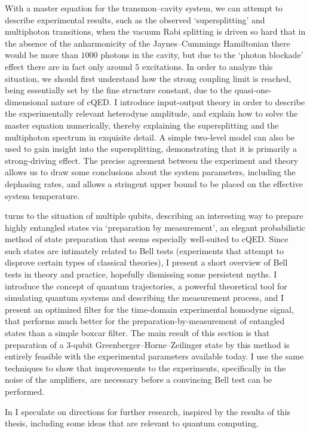 With a master equation for the transmon--cavity system, we can attempt to describe experimental results, such as the observed `supersplitting' and multiphoton transitions, when the vacuum Rabi splitting is driven so hard that in the absence of the anharmonicity of the Jaynes--Cummings Hamiltonian there would be more than $1000$ photons in the cavity, but due to the `photon blockade' effect there are in fact only around $5$ excitations. In order to analyze this situation, we should first understand how the strong coupling limit is reached, being essentially set by the fine structure constant, due to the quasi-one-dimensional nature of cQED\@. I introduce input-output theory in order to describe the experimentally relevant heterodyne amplitude, and explain how to solve the master equation numerically, thereby explaining the supersplitting and the multiphoton spectrum in exquisite detail. A simple two-level model can also be used to gain insight into the supersplitting, demonstrating that it is primarily a strong-driving effect. The precise agreement between the experiment and theory allows us to draw some conclusions about the system parameters, including the dephasing rates, and allows a stringent upper bound to be placed on the effective system temperature.

 turns to the situation of multiple qubits, describing an interesting way to prepare highly entangled states via `preparation by measurement', an elegant probabilistic method of state preparation that seems especially well-suited to cQED\@. Since such states are intimately related to Bell tests (experiments that attempt to disprove certain types of classical theories), I present a short overview of Bell tests in theory and practice, hopefully dismissing some persistent myths. I introduce the concept of quantum trajectories, a powerful theoretical tool for simulating quantum systems and describing the measurement process, and I present an optimized filter for the time-domain experimental homodyne signal, that performs much better for the preparation-by-measurement of entangled states than a simple boxcar filter. The main result of this section is that preparation of a 3-qubit Greenberger--Horne--Zeilinger state by this method is entirely feasible with the experimental parameters available today. I use the same techniques to show that improvements to the experiments, specifically in the noise of the amplifiers, are necessary before a convincing Bell test can be performed.

In  I speculate on directions for further research, inspired by the results of this thesis, including some ideas that are relevant to quantum computing.
